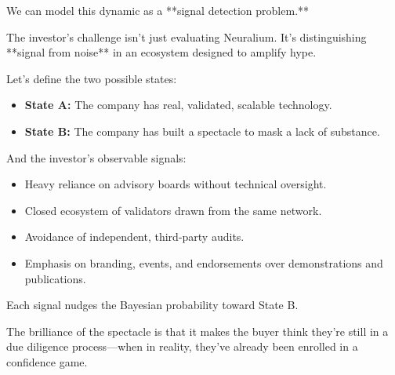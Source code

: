\medskip

We can model this dynamic as a **signal detection problem.**

The investor’s challenge isn’t just evaluating Neuralium.  
It’s distinguishing **signal from noise** in an ecosystem designed to amplify hype.

Let’s define the two possible states:

\begin{itemize}
  \item \textbf{State A:} The company has real, validated, scalable technology.
  \item \textbf{State B:} The company has built a spectacle to mask a lack of substance.
\end{itemize}

And the investor’s observable signals:

\begin{itemize}
  \item Heavy reliance on advisory boards without technical oversight.
  \item Closed ecosystem of validators drawn from the same network.
  \item Avoidance of independent, third-party audits.
  \item Emphasis on branding, events, and endorsements over demonstrations and publications.
\end{itemize}

Each signal nudges the Bayesian probability toward State B.

The brilliance of the spectacle is that it makes the buyer think they’re still in a due diligence process—when in reality, they’ve already been enrolled in a confidence game.

\medskip

